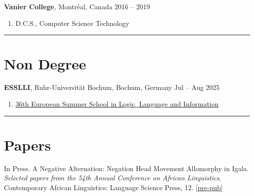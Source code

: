 \documentclass[margin,line]{resume}
\begin{document}
\begin{resume}
	\textbf{Vanier College}, Montr\'{e}al, Canada \hfill 2016 -- 2019
	\begin{enumerate}[-, leftmargin=1em, topsep=2pt]
		\item[]  D.C.S., Computer Science Technology
	\end{enumerate}

	\vspace{-1em}\rule{\textwidth}{0.4pt}


	\vspace{-1em}

	\section{\mysidestyle Non Degree}

	\textbf{ESSLLI}, Ruhr-Universität Bochum, Bochum, Germany \hfill Jul -- Aug 2025
	\begin{enumerate}[-, leftmargin=1em, topsep=2pt]
		\item[] \href{https://2025.esslli.eu/}{36th European Summer School in Logic, Language and Information}
	\end{enumerate}

	\vspace{-1.5em}
	
	\rule{\textwidth}{0.4pt}




	\vspace{-0.7em}

	\section{\mysidestyle Papers}

	 {In Press. A Negative Alternation: Negation Head Movement Allomorphy in Igala. \textit{Selected papers from the 54th Annual Conference on African Linguistics}. Contemporary African Linguistics: Language Science Press, 12. [\href{run:../papers/chaperon_acal_neg_move.pdf}{pre-pub}]}


\end{resume}
\end{document}
